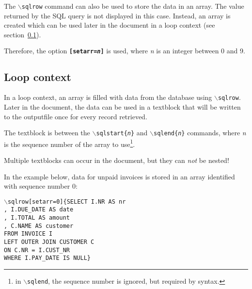 \documentclass{article}
\newcommand{\bs}{\ensuremath{\backslash}}
\newcommand{\vs}{\vspace{3mm}}
\begin{document}
The \texttt{\bs sqlrow} command can also be used to store the data in an array. The value returned by the SQL query is not displayed in this case. Instead, an array is created which can be used later in the document in a loop context (see section~\ref{loops}).

Therefore, the option \texttt{\textbf{[setarr=\textit{n}]}} is used, where \textit{n} is an integer between
0 and 9.

\subsection{Loop context}\label{loops}

In a loop context, an array is filled with data from the database using \texttt{\bs sqlrow}.\\
Later in the document, the data can be used in a textblock that will be written to the outputfile once for every record retrieved.

\vs

The textblock is between the \texttt{\bs sqlstart\{\textit{n}\}} and \texttt{\bs sqlend\{\textit{n}\}} commands, where \textit{n} is the sequence number of the array to use\footnote{ in \texttt{\bs sqlend}, the sequence number is ignored, but required by syntax.}.

Multiple textblocks can occur in the document, but they can \textit{not} be nested!

\vs

In the example below, data for unpaid invoices is stored in an array identified with sequence number 0:
 
\texttt{\bs sqlrow[setarr=0]\{SELECT I.NR AS nr\\
\hspace*{15mm},  I.DUE\_DATE AS date\\
\hspace*{15mm},  I.TOTAL AS amount\\
\hspace*{15mm},  C.NAME AS customer\\
\hspace*{15mm}FROM INVOICE I\\
\hspace*{15mm}LEFT OUTER JOIN CUSTOMER C\\
\hspace*{20mm}ON C.NR = I.CUST\_NR\\
\hspace*{15mm}WHERE I.PAY\_DATE IS NULL\}}

\vs
\end{document}

